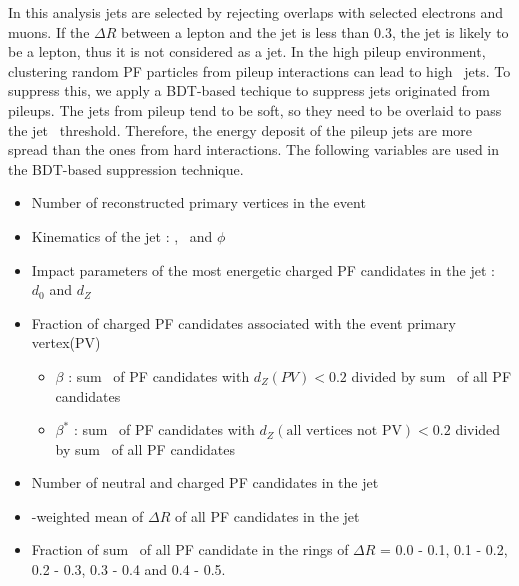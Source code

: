 In this analysis jets are selected by rejecting overlaps with selected electrons 
and muons. If the $\Delta R$ between a lepton and the jet is less than 0.3, the jet 
is likely to be a lepton, thus it is not considered as a jet. In the high pileup environment, 
clustering random PF particles from pileup interactions can lead to high \pt\ jets. 
To suppress this, we apply a BDT-based techique to suppress jets originated from pileups. 
The jets from pileup tend to be soft, so they need to be overlaid to pass the jet \pt\ threshold. 
Therefore, the energy deposit of the pileup jets are more spread 
than the ones from hard interactions. The following variables are used 
in the BDT-based suppression technique.
\begin{itemize}
\item Number of reconstructed primary vertices in the event
\item Kinematics of the jet : \pt, \Eta\ and $\phi$ 
\item Impact parameters of the most energetic charged PF candidates in the jet : $d_0$ and $d_Z$
\item Fraction of charged PF candidates associated with the event primary vertex(PV) 
    \begin{itemize}
    \item $\beta$   : sum \pt\ of PF candidates with $d_Z(PV) < 0.2$ 
                      divided by sum \pt\ of all PF candidates
    \item $\beta^*$ : sum \pt\ of PF candidates with $d_Z(\textrm{all vertices not PV}) < 0.2$
                      divided by sum \pt\ of all PF candidates
    \end{itemize}
\item Number of neutral and charged PF candidates in the jet
\item \pt-weighted mean of $\Delta R$ of all PF candidates in the jet 
\item Fraction of sum \pt\ of all PF candidate in the rings of $\Delta R$ = 0.0 - 0.1, 0.1 - 0.2, 0.2 - 0.3, 
      0.3 - 0.4 and 0.4 - 0.5.
\end{itemize}

